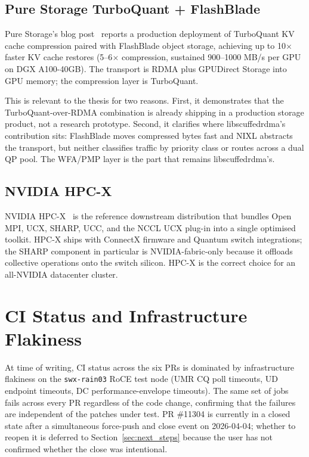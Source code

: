 \documentclass[11pt]{article}
\begin{document}
\subsection{Pure Storage TurboQuant + FlashBlade}

Pure Storage's blog post~\cite{turboquant_flashblade} reports a
production deployment of TurboQuant KV cache compression paired with
FlashBlade object storage, achieving up to 10$\times$ faster KV cache
restores (5--6$\times$ compression, sustained 900--1000 MB/s per GPU on
DGX A100-40GB). The transport is RDMA plus GPUDirect Storage into GPU
memory; the compression layer is TurboQuant.

This is relevant to the thesis for two reasons. First, it demonstrates
that the TurboQuant-over-RDMA combination is already shipping in a
production storage product, not a research prototype. Second, it
clarifies where libscuffedrdma's contribution sits: FlashBlade moves
compressed bytes fast and NIXL abstracts the transport, but neither
classifies traffic by priority class or routes across a dual QP pool.
The WFA/PMP layer is the part that remains libscuffedrdma's.

\subsection{NVIDIA HPC-X}

NVIDIA HPC-X~\cite{nvidia_hpcx} is the reference downstream distribution
that bundles Open MPI, UCX, SHARP, UCC, and the NCCL UCX plug-in into a
single optimised toolkit. HPC-X ships with ConnectX firmware and
Quantum switch integrations; the SHARP component in particular is
NVIDIA-fabric-only because it offloads collective operations onto the
switch silicon. HPC-X is the correct choice for an all-NVIDIA
datacenter cluster.

\section{CI Status and Infrastructure Flakiness}

At time of writing, CI status across the six PRs is dominated by
infrastructure flakiness on the \texttt{swx-rain03} RoCE test node
(UMR CQ poll timeouts, UD endpoint timeouts, DC performance-envelope
timeouts). The same set of jobs fails across every PR regardless of
the code change, confirming that the failures are independent of the
patches under test. PR \#11304 is currently in a closed state after a
simultaneous force-push and close event on 2026-04-04; whether to
reopen it is deferred to Section~\ref{sec:next_steps} because the user
has not confirmed whether the close was intentional.
\end{document}
